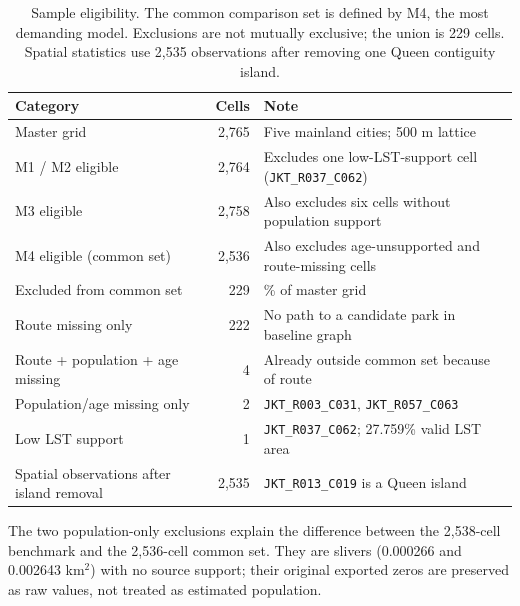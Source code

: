 \begin{table}[htbp]
\centering
\small
\caption{Sample eligibility. The common comparison set is defined by M4, the
most demanding model. Exclusions are not mutually exclusive; the union is 229
cells. Spatial statistics use 2,535 observations after removing one Queen
contiguity island.}
\label{tab:eligibility}
\begin{threeparttable}
\begin{tabularx}{\textwidth}{@{}>{\raggedright\arraybackslash}p{6.1cm} r >{\raggedright\arraybackslash}X@{}}
\toprule
Category & Cells & Note \\
\midrule
Master grid & 2,765 & Five mainland cities; 500 m lattice \\
M1 / M2 eligible & 2,764 & Excludes one low-LST-support cell (\texttt{JKT\_R037\_C062}) \\
M3 eligible & 2,758 & Also excludes six cells without population support \\
M4 eligible (common set) & 2,536 & Also excludes age-unsupported and route-missing cells \\
Excluded from common set & 229 & 8.28\% of master grid \\
\quad Route missing only & 222 & No path to a candidate park in baseline graph \\
\quad Route + population + age missing & 4 & Already outside common set because of route \\
\quad Population/age missing only & 2 & \texttt{JKT\_R003\_C031}, \texttt{JKT\_R057\_C063} \\
\quad Low LST support & 1 & \texttt{JKT\_R037\_C062}; 27.759\% valid LST area \\
Spatial observations after island removal & 2,535 & \texttt{JKT\_R013\_C019} is a Queen island \\
\bottomrule
\end{tabularx}
\begin{tablenotes}[flushleft]\footnotesize
\item The two population-only exclusions explain the difference between the 2,538-cell benchmark and the 2,536-cell common set. They are slivers (0.000266 and 0.002643 km$^2$) with no source support; their original exported zeros are preserved as raw values, not treated as estimated population.
\end{tablenotes}
\end{threeparttable}
\end{table}
